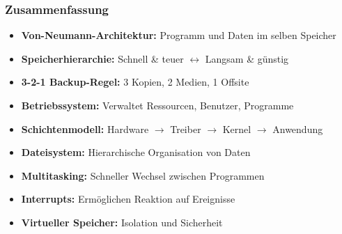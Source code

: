 \documentclass[aspectratio=169]{beamer}
\begin{document}
\begin{frame}
  \frametitle{Zusammenfassung}
  \begin{itemize}
    \item \textbf{Von-Neumann-Architektur:} Programm und Daten im selben Speicher
    \item \textbf{Speicherhierarchie:} Schnell \& teuer $\leftrightarrow$ Langsam \& günstig
    \item \textbf{3-2-1 Backup-Regel:} 3 Kopien, 2 Medien, 1 Offsite
    \item \textbf{Betriebssystem:} Verwaltet Ressourcen, Benutzer, Programme
    \item \textbf{Schichtenmodell:} Hardware $\rightarrow$ Treiber $\rightarrow$ Kernel $\rightarrow$ Anwendung
    \item \textbf{Dateisystem:} Hierarchische Organisation von Daten
    \item \textbf{Multitasking:} Schneller Wechsel zwischen Programmen
    \item \textbf{Interrupts:} Ermöglichen Reaktion auf Ereignisse
    \item \textbf{Virtueller Speicher:} Isolation und Sicherheit
  \end{itemize}
\end{frame}
\end{document}
